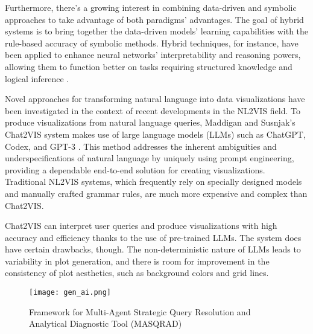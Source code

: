 Furthermore, there's a growing interest in combining data-driven and symbolic approaches to take advantage of both paradigms' advantages. The goal of hybrid systems is to bring together the data-driven models' learning capabilities with the rule-based accuracy of symbolic methods. Hybrid techniques, for instance, have been applied to enhance neural networks' interpretability and reasoning powers, allowing them to function better on tasks requiring structured knowledge and logical inference \cite{tenney2019bert, yang2020joint}.

Novel approaches for transforming natural language into data visualizations have been investigated in the context of recent developments in the NL2VIS field. To produce visualizations from natural language queries, Maddigan and Susnjak's Chat2VIS system makes use of large language models (LLMs) such as ChatGPT, Codex, and GPT-3 \cite{chat2vis}. This method addresses the inherent ambiguities and underspecifications of natural language by uniquely using prompt engineering, providing a dependable end-to-end solution for creating visualizations. Traditional NL2VIS systems, which frequently rely on specially designed models and manually crafted grammar rules, are much more expensive and complex than Chat2VIS. 

Chat2VIS can interpret user queries and produce visualizations with high accuracy and efficiency thanks to the use of pre-trained LLMs. The system does have certain drawbacks, though. The non-deterministic nature of LLMs leads to variability in plot generation, and there is room for improvement in the consistency of plot aesthetics, such as background colors and grid lines.

\begin{figure*}[!t]
    \centering
    \captionsetup{justification=centering}
    \texttt{[image: gen\_ai.png]}
    \caption{Framework for Multi-Agent Strategic Query Resolution and Analytical Diagnostic Tool (MASQRAD)}
    \label{fig:framework}
\end{figure*}

